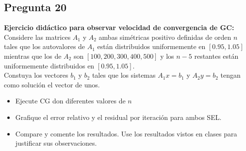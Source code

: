 \documentclass{article}
\begin{document}
\subsection*{Pregunta 20}
{\bf Ejercicio didáctico para observar velocidad de convergencia de GC:} Considere las matrices $A_1$ y $A_2$ ambas simétricas positivo definidas de orden $n$ tales que los autovalores de $A_1$ están distribuidos uniformemente en $[0.95, 1.05]$ mientras que los de $A_2$ son $[100,200, 300, 400, 500]$ y los $n-5$ restantes están uniformemente distribuidos en $[0.95, 1.05]$.\\
Constuya los vectores $b_1$ y $b_2$ tales que los sistemas $A_1x=b_1$ y $A_2y=b_2$ tengan como solución el vector de unos.\\
\begin{itemize}
\item Ejecute CG don diferentes valores de $n$
\item Grafique el error relativo y el residual por iteración para ambos SEL.
\item Compare y comente los resultados. Use los resultados vistos en clases para justificar sus observaciones.
\end{itemize}
\end{document}
